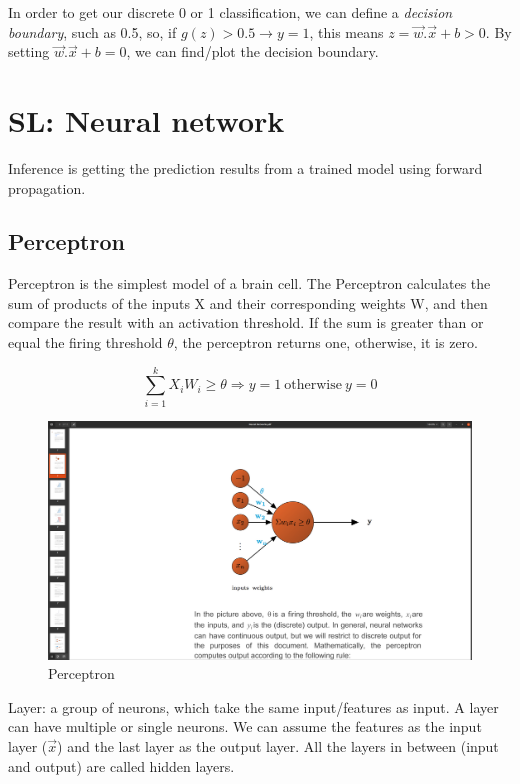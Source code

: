 \documentclass[12pt]{report}
\begin{document}
In order to get our discrete 0 or 1 classification, we can define a \textit{decision boundary}, such as 0.5, so, if $g(z) > 0.5 \rightarrow y=1$, this means $ z= \overrightarrow{w} . \overrightarrow{x}+b>0$. By setting $\overrightarrow{w} . \overrightarrow{x}+b =0$, we can find/plot the decision boundary.


\section{SL: Neural network}

Inference is getting the prediction results from a trained model using forward propagation.

\subsection{Perceptron}

Perceptron is the simplest model of a brain cell. The Perceptron calculates the sum of products of the inputs X and their corresponding weights W, and then compare the result with an activation threshold. If the sum is greater than or equal the firing threshold $\theta$, the perceptron returns one, otherwise, it is zero.

\begin{equation}
\sum_{i=1}^k X_i W_i \ge \theta  \Rightarrow y = 1 \: \text{otherwise} \: y = 0
\end{equation}

\begin{figure}[H]
	\centering
	\caption{Perceptron}
	\includegraphics[trim =20cm 15.0cm 10cm 8cm, clip, scale=0.2]{pics/perceptron.png}
\end{figure}
Layer: a group of neurons, which take the same input/features as input. A layer can have multiple or single neurons. We can assume the features as the input layer ($\overrightarrow{x}$) and the last layer as the output layer. All the layers in between (input and output) are called hidden layers.
\end{document}
